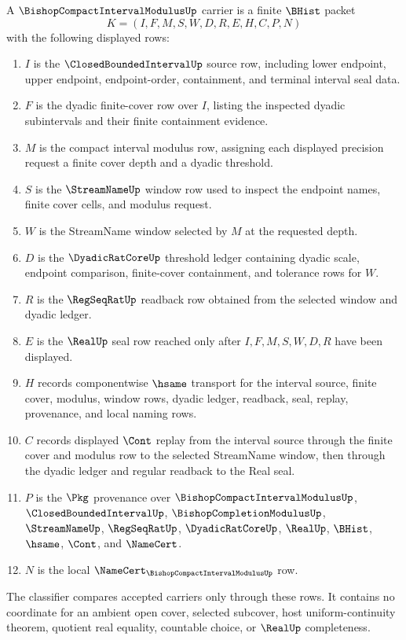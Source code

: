 \begin{definition}
\label{def:bishop-compact-interval-modulus-carrier}
A $\BishopCompactIntervalModulusUp$ carrier is a finite $\BHist$ packet
$$
K=(I,F,M,S,W,D,R,E,H,C,P,N)
$$
with the following displayed rows:
\begin{enumerate}
\item $I$ is the $\ClosedBoundedIntervalUp$ source row, including lower endpoint, upper endpoint, endpoint-order, containment, and terminal interval seal data.
\item $F$ is the dyadic finite-cover row over $I$, listing the inspected dyadic subintervals and their finite containment evidence.
\item $M$ is the compact interval modulus row, assigning each displayed precision request a finite cover depth and a dyadic threshold.
\item $S$ is the $\StreamNameUp$ window row used to inspect the endpoint names, finite cover cells, and modulus request.
\item $W$ is the StreamName window selected by $M$ at the requested depth.
\item $D$ is the $\DyadicRatCoreUp$ threshold ledger containing dyadic scale, endpoint comparison, finite-cover containment, and tolerance rows for $W$.
\item $R$ is the $\RegSeqRatUp$ readback row obtained from the selected window and dyadic ledger.
\item $E$ is the $\RealUp$ seal row reached only after $I,F,M,S,W,D,R$ have been displayed.
\item $H$ records componentwise $\hsame$ transport for the interval source, finite cover, modulus, window rows, dyadic ledger, readback, seal, replay, provenance, and local naming rows.
\item $C$ records displayed $\Cont$ replay from the interval source through the finite cover and modulus row to the selected StreamName window, then through the dyadic ledger and regular readback to the Real seal.
\item $P$ is the $\Pkg$ provenance over $\BishopCompactIntervalModulusUp$, $\ClosedBoundedIntervalUp$, $\BishopCompletionModulusUp$, $\StreamNameUp$, $\RegSeqRatUp$, $\DyadicRatCoreUp$, $\RealUp$, $\BHist$, $\hsame$, $\Cont$, and $\NameCert$.
\item $N$ is the local $\NameCert_{\BishopCompactIntervalModulusUp}$ row.
\end{enumerate}
The classifier compares accepted carriers only through these rows. It contains no coordinate for an ambient open cover, selected subcover, host uniform-continuity theorem, quotient real equality, countable choice, or $\RealUp$ completeness.
\end{definition}

